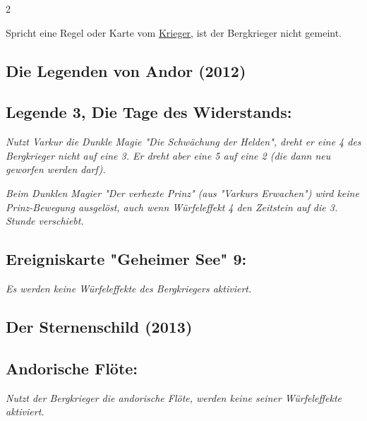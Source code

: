 \documentclass[10pt, a4paper, oneside]{book}
\newcommand{\fan}[1]{\textit{#1}}
\begin{document}
\begin{multicols*}{2}
\begin{nobgcolor}
Spricht eine Regel oder Karte vom \hyperref[krieger]{Krieger}, ist der Bergkrieger nicht gemeint.

\end{nobgcolor}






\begin{bgcolor}

\section{Die Legenden von Andor (2012)}



\subsection{Legende 3, Die Tage des Widerstands:}

\fan{Nutzt Varkur die Dunkle Magie "Die Schwächung der Helden", dreht er eine 4 des Bergkrieger nicht auf eine 3. Er dreht aber eine 5 auf eine 2 (die dann neu geworfen werden darf).}

\fan{Beim Dunklen Magier "Der verhexte Prinz" (aus "Varkurs Erwachen") wird keine Prinz-Bewegung ausgelöst, auch wenn Würfeleffekt 4 den Zeitstein auf die 3. Stunde verschiebt.}







\subsection{Ereigniskarte "Geheimer See" 9:}

\fan{Es werden keine Würfeleffekte des Bergkriegers aktiviert.}

\end{bgcolor}



\begin{bgcolor}
\section{Der Sternenschild (2013)}

\subsection{Andorische Flöte:}

\fan{Nutzt der Bergkrieger die andorische Flöte, werden keine seiner Würfeleffekte aktiviert.}




\end{bgcolor}
\end{multicols*}
\end{document}
